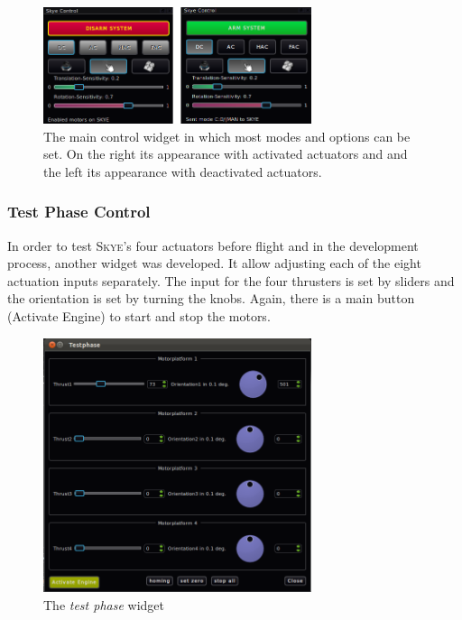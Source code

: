 \begin{figure}[H] %
	\begin{center}
		\includegraphics[width=0.7\textwidth]{qgc_skye_control}
		\caption{The main control widget in which most modes and options can be set. On the right its appearance with activated actuators and and the left its appearance with deactivated actuators.}
		\label{fig:qgc_skye_control}		
	\end{center}
\end{figure}



\subsubsection{Test Phase Control}
In order to test \textsc{Skye}'s four actuators before flight and in the development process, another widget was developed. It allow adjusting each of the eight actuation inputs separately. The input for the four thrusters is set by sliders and the orientation is set by turning the knobs. Again, there is a main button (Activate Engine) to start and stop the motors.

\begin{figure}[H] %
	\begin{center}
		\includegraphics[width=0.7\textwidth]{qgc_test_phase}
		\caption{The \textit{test phase} widget }  
		\label{figure:qgc_test_phase}
	\end{center}
\end{figure}


